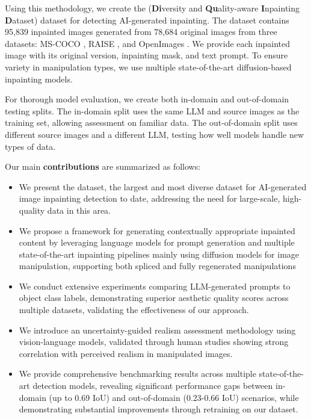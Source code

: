 Using this methodology, we create the \emph{\datasetname} (\textbf{Di}versity and \textbf{Qu}ality-aware \textbf{I}npainting \textbf{D}ataset) dataset for detecting AI-generated inpainting. The dataset contains 95,839 inpainted images generated from 78,684 original images from three datasets: MS-COCO \cite{lin2014coco}, RAISE \cite{dang2015raise}, and OpenImages \cite{kuznetsova2020open}. We provide each inpainted image with its original version, inpainting mask, and text prompt. To ensure variety in manipulation types, we use multiple state-of-the-art diffusion-based inpainting models.

For thorough model evaluation, we create both in-domain and out-of-domain testing splits. The in-domain split uses the same LLM and source images as the training set, allowing assessment on familiar data. The out-of-domain split uses different source images and a different LLM, testing how well models handle new types of data.

Our main \textbf{contributions} are summarized as follows:

\begin{itemize} 
\item We present the \emph{\datasetname} dataset, the largest and most diverse dataset for AI-generated image inpainting detection to date, addressing the need for large-scale, high-quality data in this area. 
\item We propose a framework for generating contextually appropriate inpainted content by leveraging language models for prompt generation and multiple state-of-the-art inpainting pipelines mainly using diffusion models for image manipulation, supporting both spliced and fully regenerated manipulations
\item We conduct extensive experiments comparing LLM-generated prompts to object class labels, demonstrating superior aesthetic quality scores across multiple datasets, validating the effectiveness of our approach.
\item We introduce an uncertainty-guided realism assessment methodology using vision-language models, validated through human studies showing strong correlation with perceived realism in manipulated images.
\item We provide comprehensive benchmarking results across multiple state-of-the-art detection models, revealing significant performance gaps between in-domain (up to 0.69 IoU) and out-of-domain (0.23-0.66 IoU) scenarios, while demonstrating substantial improvements through retraining on our dataset.
\end{itemize}
